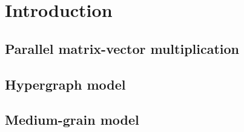 \chapter{Introduction}
\section{Parallel matrix-vector multiplication}
\section{Hypergraph model}
\section{Medium-grain model}